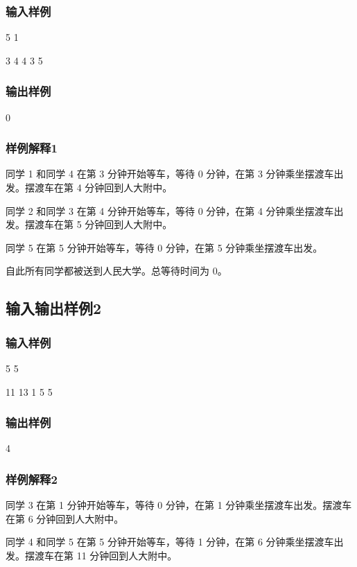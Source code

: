 \documentclass[UTF8]{ctexart}
\begin{document}
\subsubsection{输入样例}

5 1 

3 4 4 3 5 

\subsubsection{输出样例}

0

\subsubsection{样例解释1}

同学 1 和同学 4 在第 3 分钟开始等车，等待 0 分钟，在第 3 分钟乘坐摆渡车出发。摆渡车在第 4 分钟回到人大附中。

同学 2 和同学 3 在第 4 分钟开始等车，等待 0 分钟，在第 4 分钟乘坐摆渡车出发。摆渡车在第 5 分钟回到人大附中。

同学 5 在第 5 分钟开始等车，等待 0 分钟，在第 5 分钟乘坐摆渡车出发。

自此所有同学都被送到人民大学。总等待时间为 0。

\subsection{输入输出样例2}
\subsubsection{输入样例}

5 5 

11 13 1 5 5 

\subsubsection{输出样例}

4

\subsubsection{样例解释2}

同学 3 在第 1 分钟开始等车，等待 0 分钟，在第 1 分钟乘坐摆渡车出发。摆渡车在第 6 分钟回到人大附中。

同学 4 和同学 5 在第 5 分钟开始等车，等待 1 分钟，在第 6 分钟乘坐摆渡车出发。摆渡车在第 11 分钟回到人大附中。
\end{document}
